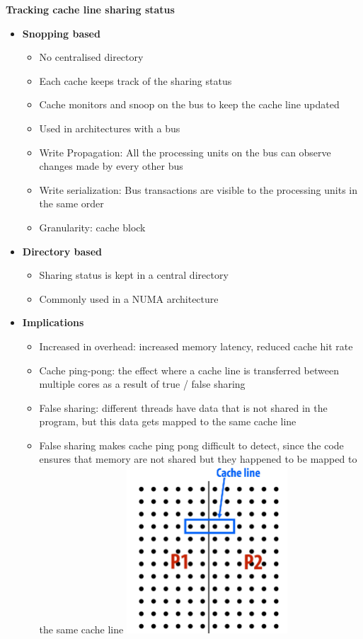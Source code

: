 \documentclass[10pt, landscape]{article}
\begin{document}
\begin{multicols}{4}
\textbf{Tracking cache line sharing status}
\begin{itemize}
    \item \textbf{Snopping based}
    \begin{itemize}
        \item No centralised directory 
        \item Each cache keeps track of the sharing status 
        \item Cache monitors and snoop on the bus to keep the cache line updated 
        \item Used in architectures with a bus
        \item Write Propagation: All the processing units on the bus can observe changes made by every other bus 
        \item Write serialization: Bus transactions are visible to the processing units in the same order 
        \item Granularity: cache block
    \end{itemize}
    \item \textbf{Directory based}
    \begin{itemize}
        \item Sharing status is kept in a central directory 
        \item Commonly used in a NUMA architecture
    \end{itemize}
    \item \textbf{Implications}
    \begin{itemize}
        \item Increased in overhead: increased memory latency, reduced cache hit rate 
        \item Cache ping-pong: the effect where a cache line is transferred between multiple cores as a result of true / false sharing
        \item False sharing: different threads have data that is not shared in the program, but this data gets mapped to the same cache line  
        \item False sharing makes cache ping pong difficult to detect, since the code ensures that memory are not shared but they happened to be mapped to the same cache line
        \includegraphics*[width=6cm]{false_sharing.png}
    \end{itemize}
\end{itemize}


\end{multicols}
\end{document}
